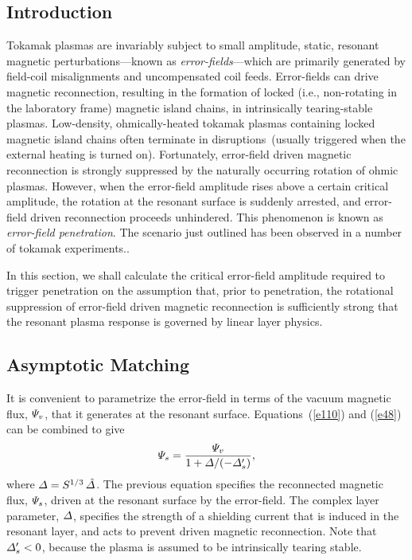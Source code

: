 \documentclass[12pt,prb,aps]{revtex4-1}
\begin{document}
\subsection{Introduction}
Tokamak plasmas are invariably subject to small amplitude, static, resonant magnetic perturbations---known as
{\em error-fields}---which are primarily generated by field-coil misalignments and uncompensated coil feeds. 
Error-fields can drive magnetic reconnection, resulting in the formation of  locked (i.e., non-rotating in the laboratory
frame) magnetic island chains, in intrinsically tearing-stable plasmas. Low-density, ohmically-heated tokamak plasmas
containing locked magnetic island chains often terminate in disruptions\,\cite{wes1} (usually triggered when the
external heating is turned on). Fortunately, error-field driven magnetic reconnection is strongly
suppressed by the naturally occurring rotation of ohmic plasmas. However, when the error-field amplitude rises
above a certain critical amplitude, the rotation at the resonant surface is suddenly arrested, and error-field driven reconnection proceeds
unhindered. This phenomenon is known as {\em error-field penetration}.\cite{rf1993,rf1998} The scenario
just outlined has been observed in a number of tokamak experiments.\cite{scoville, hender,
fishpool,wolf, wolfe,howell,menard,wang1,wang2}. 

In this section, we shall calculate the critical error-field amplitude required to trigger penetration on the assumption that,
prior to penetration, the rotational suppression of error-field driven magnetic reconnection is sufficiently strong that
the resonant plasma response is governed by linear layer physics.\cite{rf1993,rf1998,cole}

\subsection{Asymptotic Matching}
It is convenient to parametrize the error-field in terms of the vacuum magnetic flux, ${\mit\Psi}_v$, that it generates at the resonant surface. 
Equations~(\ref{e110}) and (\ref{e48}) can be combined to give
\begin{equation}\label{e383}
{\mit\Psi}_s= \frac{{\mit\Psi}_v}{1+{\mit\Delta}/(-{\mit\Delta}_s')},
\end{equation}
where ${\mit\Delta} = S^{1/3}\,\hat{\mit\Delta}$. 
The previous equation specifies the reconnected magnetic flux, ${\mit\Psi}_s$, driven at the resonant surface by the error-field. The complex layer parameter, ${\mit\Delta}$, specifies the strength of a shielding current
that is induced in the resonant layer, and acts to prevent driven magnetic reconnection. Note that ${\mit\Delta}_s'<0$, because the
plasma is assumed to be intrinsically tearing stable. 
\end{document}
